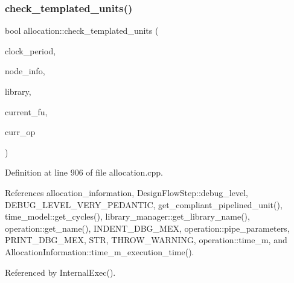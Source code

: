 \subsubsection{\texorpdfstring{check\+\_\+templated\+\_\+units()}{check\_templated\_units()}}
{\footnotesize\ttfamily bool allocation\+::check\+\_\+templated\+\_\+units (\begin{DoxyParamCaption}\item[{double}]{clock\+\_\+period,  }\item[{node\+\_\+kind\+\_\+prec\+\_\+info\+Ref}]{node\+\_\+info,  }\item[{const \hyperlink{library__manager_8hpp_aacc6d633b0aa80ecfeb1180fd480ae68}{library\+\_\+manager\+Ref}}]{library,  }\item[{\hyperlink{technology__node_8hpp_a33dd193b7bd6b987bf0d8a770a819fa7}{technology\+\_\+node\+Ref}}]{current\+\_\+fu,  }\item[{\hyperlink{structoperation}{operation} $\ast$}]{curr\+\_\+op }\end{DoxyParamCaption})\hspace{0.3cm}{\ttfamily [protected]}}



Definition at line 906 of file allocation.\+cpp.



References allocation\+\_\+information, Design\+Flow\+Step\+::debug\+\_\+level, D\+E\+B\+U\+G\+\_\+\+L\+E\+V\+E\+L\+\_\+\+V\+E\+R\+Y\+\_\+\+P\+E\+D\+A\+N\+T\+IC, get\+\_\+compliant\+\_\+pipelined\+\_\+unit(), time\+\_\+model\+::get\+\_\+cycles(), library\+\_\+manager\+::get\+\_\+library\+\_\+name(), operation\+::get\+\_\+name(), I\+N\+D\+E\+N\+T\+\_\+\+D\+B\+G\+\_\+\+M\+EX, operation\+::pipe\+\_\+parameters, P\+R\+I\+N\+T\+\_\+\+D\+B\+G\+\_\+\+M\+EX, S\+TR, T\+H\+R\+O\+W\+\_\+\+W\+A\+R\+N\+I\+NG, operation\+::time\+\_\+m, and Allocation\+Information\+::time\+\_\+m\+\_\+execution\+\_\+time().



Referenced by Internal\+Exec().

